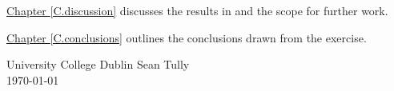 \hyperref[C.discussion]{Chapter \ref*{C.discussion}} discusses the results in
and the scope for further work.

\hyperref[C.conclusions]{Chapter \ref*{C.conclusions}} outlines the conclusions
drawn from the exercise.

\vspace{2em}

University College Dublin \hfill Sean Tully \\
\today 
